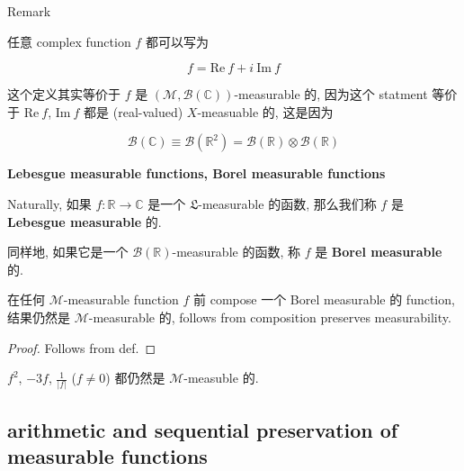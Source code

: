 \documentclass{qlnotes-export}
\begin{document}
\begin{qlremark}{Remark}

任意 complex function \(f\) 都可以写为

\[f = \text{Re}\ f + i\ \text{Im}\ f\]

这个定义其实等价于 \(f\) 是 \((\mathcal{M},\mathcal{B}({\mathbb{C}}))\)-measurable 的, 因为这个 statment 等价于 \(\text{Re}\ f\), \(\text{Im}\ f\) 都是 (real-valued) \(X\)-measuable 的, 这是因为

\[\mathcal{B}({\mathbb{C}}) \equiv \mathcal{B}({\mathbb{R}}^{2}) = \mathcal{B}({\mathbb{R}}) \otimes \mathcal{B}({\mathbb{R}})\]

\end{qlremark}

\begin{definition}{\protect{}\label{kn-lebesgue-measurable-functions-borel-measurable-functions}{\textbf{Lebesgue
measurable functions, Borel measurable functions}}}

Naturally, 如果 \(f:{\mathbb{R}}\rightarrow{\mathbb{C}}\) 是一个 \(\mathfrak{L}\)-measurable 的函数, 那么我们称 \(f\) 是 \textbf{Lebesgue measurable} 的.

同样地, 如果它是一个 \(\mathcal{B}({\mathbb{R}})\)-measurable 的函数, 称 \(f\) 是 \textbf{Borel measurable} 的.

\end{definition}

\begin{proposition}

在任何 \(\mathcal{M}\)-measurable function \(f\) 前 compose 一个 Borel measurable 的 function, 结果仍然是 \(\mathcal{M}\)-measurable 的, follows from composition preserves measurability.

\end{proposition}

\begin{proof}

Follows from def.

\end{proof}

\begin{example}

\(f^{2}\), \(- 3f\), \(\frac{1}{|f|}\) (\(f \neq 0\)) 都仍然是 \(\mathcal{M}\)-measuble 的.

\end{example}

\subsection{arithmetic and sequential preservation of measurable functions}\label{arithmetic-and-sequential-preservation-of-measurable-functions}
\end{document}
